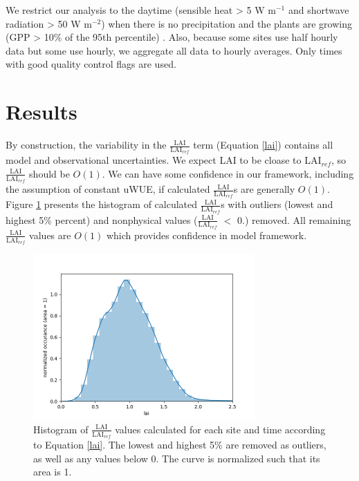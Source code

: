 \documentclass[draft,linenumbers]{agujournal}
\begin{document}
We restrict our analysis to the daytime (sensible heat > 5 W m$^{-1}$ and shortwave radiation > 50 W m$^{-2}$) when there is no precipitation and the plants are growing (GPP > 10\% of the 95th percentile) . Also, because some sites use half hourly data but some use hourly, we aggregate all data to hourly averages. Only times with good quality control flags are used.

\section{Results}
\label{results}

By construction, the variability in the $\frac{\text{LAI}}{\text{LAI$_{ref}$}}$ term (Equation \ref{lai}) contains all model and observational uncertainties. We expect LAI to be cloase to LAI$_{ref}$, so $\frac{\text{LAI}}{\text{LAI$_{ref}$}}$ should be $O(1)$. We can have some confidence in our framework, including the assumption of constant uWUE, if calculated $\frac{\text{LAI}}{\text{LAI$_{ref}$}}$s are generally $O(1)$. Figure \ref{lai_fig} presents the histogram of calculated $\frac{\text{LAI}}{\text{LAI$_{ref}$}}$s with outliers (lowest and highest 5\% percent) and nonphysical values ($\frac{\text{LAI}}{\text{LAI$_{ref}$}}$ $<$ 0.) removed. All remaining $\frac{\text{LAI}}{\text{LAI$_{ref}$}}$ values are $O(1)$ which provides confidence in model framework.

\begin{figure}[h]
\centering
\includegraphics[width=20pc]{./fig02.png}
\caption{Histogram of $\frac{\text{LAI}}{\text{LAI$_{ref}$}}$ values calculated for each site and time according to Equation \ref{lai}. The lowest and highest 5\% are removed as outliers, as well as any values below 0. The curve is normalized such that its area is 1. }
\label{lai_fig}
\end{figure}
\end{document}
